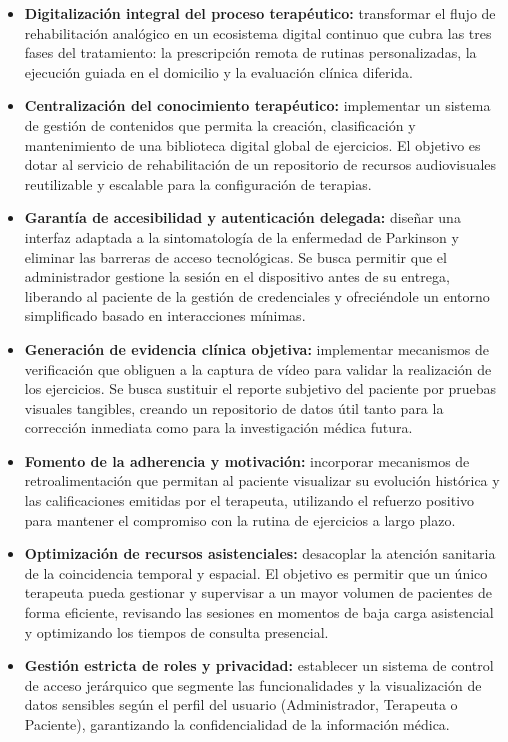 \begin{itemize}
    \item \textbf{Digitalización integral del proceso terapéutico:} transformar el flujo de rehabilitación analógico en un ecosistema digital continuo que cubra las tres fases del tratamiento: la prescripción remota de rutinas personalizadas, la ejecución guiada en el domicilio y la evaluación clínica diferida.

    \item \textbf{Centralización del conocimiento terapéutico:} implementar un sistema de gestión de contenidos que permita la creación, clasificación y mantenimiento de una biblioteca digital global de ejercicios. El objetivo es dotar al servicio de rehabilitación de un repositorio de recursos audiovisuales reutilizable y escalable para la configuración de terapias.

    \item \textbf{Garantía de accesibilidad y autenticación delegada:} diseñar una interfaz adaptada a la sintomatología de la enfermedad de Parkinson y eliminar las barreras de acceso tecnológicas. Se busca permitir que el administrador gestione la sesión en el dispositivo antes de su entrega, liberando al paciente de la gestión de credenciales y ofreciéndole un entorno simplificado basado en interacciones mínimas.

    \item \textbf{Generación de evidencia clínica objetiva:} implementar mecanismos de verificación que obliguen a la captura de vídeo para validar la realización de los ejercicios. Se busca sustituir el reporte subjetivo del paciente por pruebas visuales tangibles, creando un repositorio de datos útil tanto para la corrección inmediata como para la investigación médica futura.

    \item \textbf{Fomento de la adherencia y motivación:} incorporar mecanismos de retroalimentación que permitan al paciente visualizar su evolución histórica y las calificaciones emitidas por el terapeuta, utilizando el refuerzo positivo para mantener el compromiso con la rutina de ejercicios a largo plazo.

    \item \textbf{Optimización de recursos asistenciales:} desacoplar la atención sanitaria de la coincidencia temporal y espacial. El objetivo es permitir que un único terapeuta pueda gestionar y supervisar a un mayor volumen de pacientes de forma eficiente, revisando las sesiones en momentos de baja carga asistencial y optimizando los tiempos de consulta presencial.

    \item \textbf{Gestión estricta de roles y privacidad:} establecer un sistema de control de acceso jerárquico que segmente las funcionalidades y la visualización de datos sensibles según el perfil del usuario (Administrador, Terapeuta o Paciente), garantizando la confidencialidad de la información médica.
\end{itemize}

